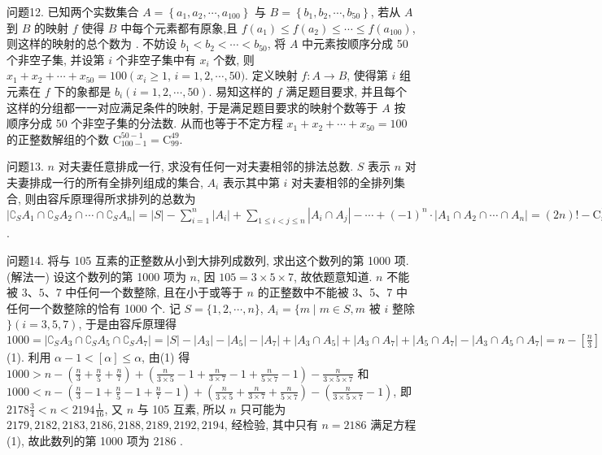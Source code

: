 问题12. 已知两个实数集合 $A=\left\{a_1, a_2, \cdots, a_{100}\right\}$ 与 $B=\left\{b_1, b_2, \cdots, b_{50}\right\}$, 若从 $A$ 到 $B$ 的映射 $f$ 使得 $B$ 中每个元素都有原象,且 $f\left(a_1\right) \leqslant f\left(a_2\right) \leqslant \cdots \leqslant f\left(a_{100}\right)$, 则这样的映射的总个数为 . 
不妨设 $b_1<b_2<\cdots<b_{50}$, 将 $A$ 中元素按顺序分成 50 个非空子集, 并设第 $i$ 个非空子集中有 $x_i$ 个数, 则 $x_1+x_2+\cdots+x_{50}=100\left(x_i \geqslant 1\right.$, $i=1,2, \cdots, 50)$. 定义映射 $f: A \rightarrow B$, 使得第 $i$ 组元素在 $f$ 下的象都是 $b_i(i=1,2, \cdots, 50)$. 易知这样的 $f$ 满足题目要求, 并且每个这样的分组都一一对应满足条件的映射, 于是满足题目要求的映射个数等于 $A$ 按顺序分成 50 个非空子集的分法数.
从而也等于不定方程 $x_1+x_2+\cdots+x_{50}=100$ 的正整数解组的个数 $\mathrm{C}_{100-1}^{50-1}=\mathrm{C}_{99}^{49}$.



问题13. $n$ 对夫妻任意排成一行, 求没有任何一对夫妻相邻的排法总数.
$S$ 表示 $n$ 对夫妻排成一行的所有全排列组成的集合, $A_i$ 表示其中第 $i$ 对夫妻相邻的全排列集合, 则由容斥原理得所求排列的总数为
$\left|\complement_S A_1 \cap \complement_S A_2 \cap \cdots \cap \complement_S A_n\right|=|S|-\sum_{i=1}^n\left|A_i\right|+\sum_{1 \leqslant i<j \leqslant n}\left|A_i \cap A_j\right|- \cdots+(-1)^n \cdot\left|A_1 \cap A_2 \cap \cdots \cap A_n\right|=(2 n) !-\mathrm{C}_n^1 \cdot 2(2 n-1) !+\mathrm{C}_n^2 2^2 \cdot (2 n-2) !-\cdots+(-1)^k \mathrm{C}_n^k 2^k(2 n-k) !+\cdots+(-1)^n \mathrm{C}_{2 n}^{2 n} \cdot 2^n \cdot n !$.



问题14. 将与 105 互素的正整数从小到大排列成数列, 求出这个数列的第 1000 项.
(解法一) 设这个数列的第 1000 项为 $n$, 因 $105=3 \times 5 \times 7$, 故依题意知道.
$n$ 不能被 $3 、 5 、 7$ 中任何一个数整除, 且在小于或等于 $n$ 的正整数中不能被 3、5、7 中任何一个数整除的恰有 1000 个.
记 $S=\{1,2, \cdots, n\}$, $A_i=\{m \mid m \in S, m$ 被 $i$ 整除 $\}(i=3,5,7)$, 于是由容斥原理得 $1000= \left|\complement_S A_3 \cap \complement_S A_5 \cap \complement_S A_7\right|=|S|-\left|A_3\right|-\left|A_5\right|-\left|A_7\right|+\left|A_3 \cap A_5\right|+ \left|A_3 \cap A_7\right|+\left|A_5 \cap A_7\right|-\left|A_3 \cap A_5 \cap A_7\right|=n-\left[\frac{n}{3}\right]-\left[\frac{n}{5}\right]-\left[\frac{n}{7}\right]+ \left[\frac{n}{3 \times 5}\right]+\left[\frac{n}{3 \times 7}\right]+\left[\frac{n}{5 \times 7}\right]-\left[\frac{n}{3 \times 5 \times 7}\right] \cdots$ (1). 利用 $\alpha-1<[\alpha] \leqslant \alpha$, 由(1) 得 $1000>n-\left(\frac{n}{3}+\frac{n}{5}+\frac{n}{7}\right)+\left(\frac{n}{3 \times 5}-1+\frac{n}{3 \times 7}-1+\frac{n}{5 \times 7}-1\right)- \frac{n}{3 \times 5 \times 7}$ 和 $1000<n-\left(\frac{n}{3}-1+\frac{n}{5}-1+\frac{n}{7}-1\right)+\left(\frac{n}{3 \times 5}+\frac{n}{3 \times 7}+\frac{n}{5 \times 7}\right)- \left(\frac{n}{3 \times 5 \times 7}-1\right)$, 即 $2178 \frac{3}{4}<n<2194 \frac{1}{16}$, 又 $n$ 与 105 互素, 所以 $n$ 只可能为 $2179,2182,2183,2186,2188,2189,2192,2194$, 经检验, 其中只有 $n=2186$ 满足方程 (1), 故此数列的第 1000 项为 2186 .




